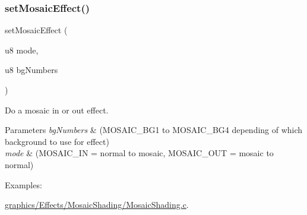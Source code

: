 \subsubsection{\texorpdfstring{set\+Mosaic\+Effect()}{setMosaicEffect()}}
{\footnotesize\ttfamily set\+Mosaic\+Effect (\begin{DoxyParamCaption}\item[{u8}]{mode,  }\item[{u8}]{bg\+Numbers }\end{DoxyParamCaption})}



Do a mosaic in or out effect. 


\begin{DoxyParams}{Parameters}
{\em bg\+Numbers} & (M\+O\+S\+A\+I\+C\+\_\+\+B\+G1 to M\+O\+S\+A\+I\+C\+\_\+\+B\+G4 depending of which background to use for effect) \\
\hline
{\em mode} & (M\+O\+S\+A\+I\+C\+\_\+\+IN = normal to mosaic, M\+O\+S\+A\+I\+C\+\_\+\+O\+UT = mosaic to normal) \\
\hline
\end{DoxyParams}
\begin{Desc}
\item[Examples\+: ]\par
\hyperlink{a00406}{graphics/\+Effects/\+Mosaic\+Shading/\+Mosaic\+Shading.\+c}.\end{Desc}
